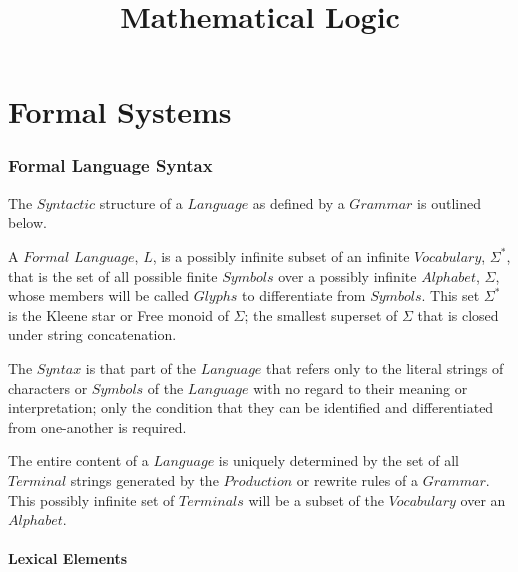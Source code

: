 \documentclass{article}
\begin{document}
\setcounter{secnumdepth}{5}
\setcounter{tocdepth}{5}


\title{Mathematical Logic}
\date{}
\maketitle


\tableofcontents


\part{Formal Systems}

\section{Formal Language Syntax}

The $Syntactic$ structure of a $Language$ as defined by a $Grammar$ is
outlined below.

A $Formal$ $Language$, $L$, is a possibly infinite subset of an
infinite $Vocabulary$, $\Sigma^*$, that is the set of all possible
finite $Symbols$ over a possibly infinite $Alphabet$, $\Sigma$, whose
members will be called $Glyphs$ to differentiate from $Symbols$. This
set $\Sigma^*$ is the Kleene star or Free monoid of $\Sigma$; the
smallest superset of $\Sigma$ that is closed under string
concatenation.

The $Syntax$ is that part of the $Language$ that refers only to the
literal strings of characters or $Symbols$ of the $Language$ with no
regard to their meaning or interpretation; only the condition that
they can be identified and differentiated from one-another is
required.

The entire content of a $Language$ is uniquely determined by the set
of all $Terminal$ strings generated by the $Production$ or rewrite
rules of a $Grammar$. This possibly infinite set of $Terminals$ will
be a subset of the $Vocabulary$ over an $Alphabet$.

\subsection{Lexical Elements}
\end{document}
